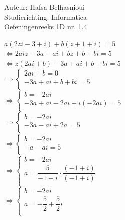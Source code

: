\documentclass[a4paper]{article}
\begin{document}
\noindent \large Auteur: Hafsa Belhasnioui \\
\noindent \large Studierichting: Informatica\\
\noindent \large Oefeningenreeks 1D nr. 1.4\\

\medskip

\normalsize

$a(2zi - 3 + i) + b(z + 1 + i) = 5$ \\

$\Leftrightarrow 2aiz - 3a + ai + bz + b + bi = 5$ \\

$\Leftrightarrow z(2ai + b) - 3a + ai + b + bi = 5$ \\

$\Rightarrow
\left \{
\begin{array}{l}
2ai + b = 0 \\
-3a + ai + b + bi = 5\\
\end{array}
\right.$ \\

$\Rightarrow \left \{
\begin{array}{l}
b = -2ai\\
-3a + ai - 2ai + i(-2ai)= 5\\
\end{array}
\right.$ \\

$\Rightarrow \left \{
\begin{array}{l}
b = -2ai\\
-3a - ai + 2a = 5\\
\end{array}
\right.$ \\

$\Rightarrow \left \{
\begin{array}{l}
b = -2ai\\
-a - ai = 5\\
\end{array}
\right.$ \\

$\Rightarrow \left \{
\begin{array}{l}
b = -2ai\\
a = \dfrac{5}{-1-i} \cdot \dfrac{(-1 + i)}{(-1 + i)}\\
\end{array}
\right.$ \\

$\Rightarrow \left \{
\begin{array}{l}
b = -2ai\\
a = -\dfrac{5}{2} + \dfrac{5}{2}i\\
\end{array}
\right. $\\
\end{document}
